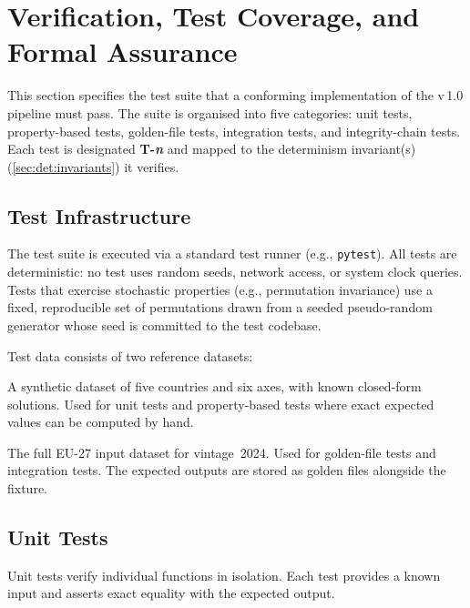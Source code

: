 \section{Verification, Test Coverage, and Formal Assurance}%
\label{sec:verification}

This section specifies the test suite that a conforming implementation of
the \ISI v\,1.0 pipeline must pass.  The suite is organised into five
categories: unit tests, property-based tests, golden-file tests,
integration tests, and integrity-chain tests.  Each test is designated
\textbf{T-\textit{n}} and mapped to the determinism invariant(s)
(\cref{sec:det:invariants}) it verifies.

\subsection{Test Infrastructure}\label{sec:test:infra}

The test suite is executed via a standard test runner (e.g., \texttt{pytest}).
All tests are deterministic: no test uses random seeds, network access, or
system clock queries.  Tests that exercise stochastic properties
(e.g., permutation invariance) use a fixed, reproducible set of permutations
drawn from a seeded pseudo-random generator whose seed is committed to the
test codebase.

Test data consists of two reference datasets:

\begin{description}[style=nextline]
  \item[\texttt{fixtures/reference\_small.json}]
    A synthetic dataset of five countries and six axes, with known
    closed-form solutions.  Used for unit tests and property-based tests
    where exact expected values can be computed by hand.
  \item[\texttt{fixtures/reference\_eu27.json}]
    The full EU-27 input dataset for vintage~2024.  Used for golden-file
    tests and integration tests.  The expected outputs are stored as golden
    files alongside the fixture.
\end{description}

\subsection{Unit Tests}\label{sec:test:unit}

Unit tests verify individual functions in isolation.  Each test provides
a known input and asserts exact equality with the expected output.

